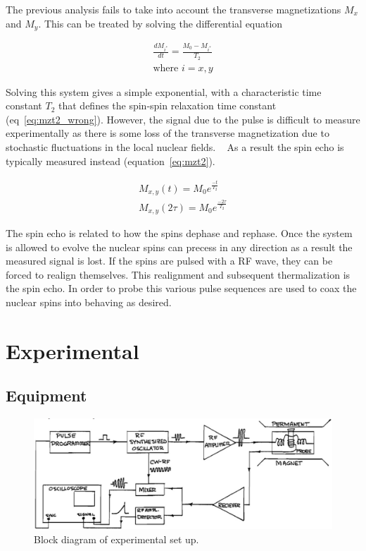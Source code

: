 \documentclass[
reprint,
amsmath,amssymb,
aps,
tikz,
border=5pt
]{revtex4-1}
\newcommand*{\tg}[1][2]{$T_#1$ }
\begin{document}
  The previous analysis fails to take into account the transverse magnetizations $M_x$ and $M_y$. This can be treated by solving the differential equation

  \begin{gather}
    \frac{dM_{i^*}}{dt} = \frac{M_0 - M_{i^*}}{T_2} \\
    \text{where } i = x , y
  \end{gather}


  Solving this system gives a simple exponential, with a characteristic time constant \tg that defines the spin-spin relaxation time constant (eq~\ref{eq:mzt2_wrong}). However, the signal due to the pulse is difficult to measure experimentally as there is some loss of the transverse magnetization due to stochastic fluctuations in the local nuclear fields. ~\cite{manual} As a result the spin echo is typically measured instead (equation~\ref{eq:mzt2}). 

  \begin{gather}
    M_{x,y}(t) = M_0  e^\frac{-t}{T_2}  \label{eq:mzt2_wrong}\\
    M_{x,y}(2\tau) = M_0  e^\frac{-2\tau}{T_2}  \label{eq:mzt2}
  \end{gather}

  The spin echo is related to how the spins dephase and rephase. Once the system is allowed to evolve the nuclear spins can precess in any direction as a result the measured signal is lost. If the spins are pulsed with a RF wave, they can be forced to realign themselves. This realignment and subsequent thermalization is the spin echo. In order to probe this various pulse sequences are used to coax the nuclear spins into behaving as desired.  


\section*{Experimental }

\subsection*{Equipment}

    \begin{figure}[h]
      \includegraphics[width=0.4 \textwidth]{figures/block_diagram.png}
      \caption{Block diagram of experimental set up.\cite{manual}}
      \label{fig:block}
    \end{figure}
\end{document}
